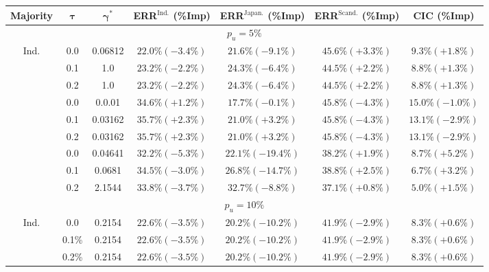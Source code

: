 \begin{table}[H]
\footnotesize
\centering
\setlength{\tabcolsep}{0.1cm}
\renewcommand{\arraystretch}{1.55}
\begin{tabular}{c|c|c|c|c|c|c|}
\toprule
\textbf{Majority} & $\boldsymbol{\tau}$ & $\boldsymbol{\gamma^*}$ & \textbf{ERR$^{\text{Ind.}}$  (\%Imp)}
& \textbf{ERR$^{\text{Japan.}}$ (\%Imp)}
& \textbf{ERR$^{\text{Scand.}}$  (\%Imp)}
& \textbf{CIC (\%Imp)} \\
\midrule
\multicolumn{7}{c}{$p_u = 5\%$}\\
\midrule
\multirow{3}{*}{Ind.} & 0.0 & 0.06812 & $22.0\% (\mathbf{-3.4\%})$ & $21.6\% (\mathbf{-9.1}\%)$ & $45.6\% (+3.3\%)$ & $9.3\% (+1.8\%)$ \\
& 0.1 & 1.0 & $23.2\% (\mathbf{-2.2\%})$ & $24.3\% (\mathbf{-6.4\%})$ & $44.5\% (+2.2\%)$ & $8.8\%(+1.3\%)$ \\
& 0.2 & 1.0 & $23.2\%(\mathbf{-2.2\%})$ & $24.3\% (\mathbf{-6.4}\%)$ & $44.5\% (+2.2\%)$ & $8.8\% (+1.3\%)$ \\
\hhline{-------}
\multirow{3}{*}{Japan.} & 0.0 & 0.0.01 & $34.6\%(+1.2\%)$ & $17.7\% (\mathbf{-0.1\%})$ & $45.8\%(\mathbf{-4.3\%})$ & $15.0\% (\mathbf{-1.0\%})$ \\
& 0.1 & 0.03162 & $35.7\% (+2.3\%)$ & $21.0\% (+3.2\%)$ & $45.8\% (\mathbf{-4.3\%})$ & $13.1\% (\mathbf{-2.9\%})$ \\
& 0.2 & 0.03162 & $35.7\% (+2.3\%)$ & $21.0\% (+3.2\%)$ & $45.8\% (\mathbf{-4.3\%})$ & $13.1\% (\mathbf{-2.9\%})$ \\
\hhline{-------}
\multirow{3}{*}{Scand.} & 0.0 & 0.04641 & $32.2\% (\mathbf{-5.3\%})$ & $22.1\% (\mathbf{-19.4\%})$ & $38.2\% (+1.9\%)$ & $8.7\% (+5.2\%)$ \\
& 0.1 & 0.0681 & $34.5\% (\mathbf{-3.0\%})$ & $26.8\% (\mathbf{-14.7}\%)$ & $38.8\% (+2.5\%)$ & $6.7\% (+3.2\%)$ \\
& 0.2 & 2.1544 & $33.8\% (\mathbf{-3.7\%})$ & $32.7\% (\mathbf{-8.8\%})$ & $37.1\% (+0.8\%)$ & $5.0\%(+1.5\%)$ \\
\midrule
\multicolumn{7}{c}{$p_u = 10\%$}\\
\midrule
\multirow{3}{*}{Ind.} & 0.0 & 0.2154 & $22.6\% (\mathbf{-3.5\%})$ & $20.2\% (\mathbf{-10.2}\%)$ & $41.9\% (\mathbf{-2.9\%})$ & $8.3\% (+0.6\%)$ \\
& 0.1\%& 0.2154 & $22.6\% (\mathbf{-3.5\%})$ & $20.2\%(\mathbf{-10.2}\%)$ & $41.9\%(\mathbf{-2.9\%})$ & $8.3\% (+0.6\%)$ \\
& 0.2\%& 0.2154 & $22.6\% (\mathbf{-3.5\%})$ & $20.2\% (\mathbf{-10.2}\%)$ & $41.9\% (\mathbf{-2.9\%})$ & $8.3\% (+0.6\%)$ \\

\end{tabular}
\end{table}
